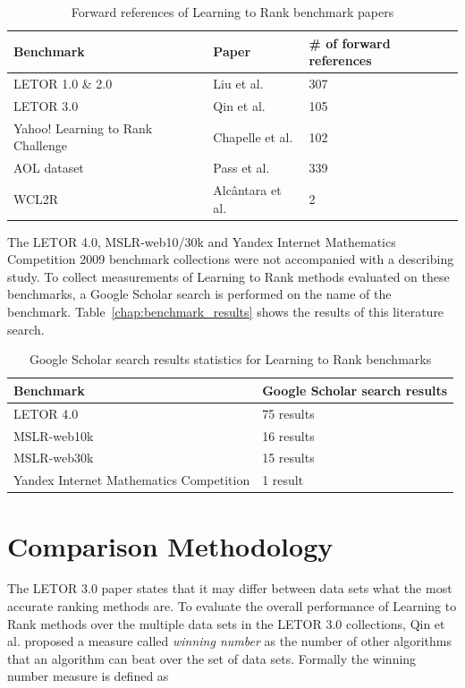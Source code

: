 \begin{table}[!h]
\begin{tabular}{l|l|l}
Benchmark & Paper & \# of forward references \\
\hline
LETOR 1.0 \& 2.0 & Liu et al. \cite{Liu2007b} & 307\\
LETOR 3.0 & Qin et al. \cite{Qin2010} & 105\\
Yahoo! Learning to Rank Challenge & Chapelle et al. \cite{Chapelle2011a} & 102\\
AOL dataset & Pass et al. \cite{Pass2006} & 339\\
WCL2R & Alc{\^a}ntara et al. \cite{Alcantara2010} & 2\\
\end{tabular}
\caption{Forward references of Learning to Rank benchmark papers}
\label{tbl:ltr_benchmark_forref}
\end{table}

The LETOR 4.0, MSLR-web10/30k and Yandex Internet Mathematics Competition 2009 benchmark collections were not accompanied with a describing study. To collect measurements of Learning to Rank methods evaluated on these benchmarks, a Google Scholar search is performed on the name of the benchmark. Table~\ref{chap:benchmark_results} shows the results of this literature search.

\begin{table}[!h]
\begin{tabular}{l|l}
Benchmark & Google Scholar search results \\
\hline
LETOR 4.0 & 75 results \\
MSLR-web10k & 16 results \\
MSLR-web30k & 15 results \\
Yandex Internet Mathematics Competition & 1 result \\ 
\end{tabular}
\caption{Google Scholar search results statistics for Learning to Rank benchmarks}
\label{tbl:ltr_benchmark_searchres}
\end{table}

\section{Comparison Methodology}
The LETOR 3.0 paper \cite{Qin2010} states that it may differ between data sets what the most accurate ranking methods are. To evaluate the overall performance of Learning to Rank methods over the multiple data sets in the LETOR 3.0 collections, Qin et al. \cite{Qin2010} proposed a measure called \emph{winning number} as the number of other algorithms that an algorithm can beat over the set of data sets. Formally the winning number measure is defined as\\

